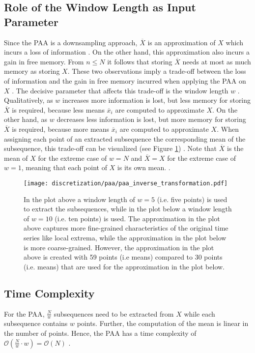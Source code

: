 \subsection*{Role of the Window Length as Input Parameter} \label{parameter_window_length}
Since the \ac{PAA} is a downsampling approach, $\overline{X}$ is an approximation of $X$ which incurs a loss of information \cite{PAA_Yi_Faloutsos}. On the other hand, this approximation also incurs a gain in free memory. From $n \leq N$ it follows that storing $\overline{X}$ needs at most as much memory as storing $X$. These two observations imply a trade-off between the loss of information and the gain in free memory incurred when applying the \ac{PAA} on $X$ \cite{SAX_Lin}. \newline
The decisive parameter that affects this trade-off is the window length $w$ \cite{SAX_Lin}. Qualitatively, as $w$ increases more information is lost, but less memory for storing $\overline{X}$ is required, because less means $\overline{x}_i$ are computed to approximate $X$. On the other hand, as $w$ decreases less information is lost, but more memory for storing $\overline{X}$ is required, because more means $\overline{x}_i$ are computed to approximate $X$. When assigning each point of an extracted subsequence the corresponding mean of the subsequence, this trade-off can be visualized (see Figure \ref{fig:PAA_inverse}) \cite{SAX_Lin}. \newline
Note that $\overline{X}$ is the mean of $X$ for the extreme case of $w = N$ and $\overline{X} = X$ for the extreme case of $w = 1$, meaning that each point of $X$ is its own mean. \cite{PAA_Keogh}.
\begin{figure}[htb]
\centering
\texttt{[image: discretization/paa/paa\_inverse\_transformation.pdf]}
\caption[Piecewise Aggregate Approximation - Effect of Window Size]{In the plot above a window length of $w = 5$ (i.e. five points) is used to extract the subsequences, while in the plot below a window length of $w = 10$ (i.e. ten points) is used. The approximation in the plot above captures more fine-grained characteristics of the original time series like local extrema, while the approximation in the plot below is more coarse-grained. However, the approximation in the plot above is created with 59 points (i.e means) compared to 30 points (i.e. means) that are used for the approximation in the plot below.} 
\label{fig:PAA_inverse}
\end{figure}
\subsection*{Time Complexity}
For the \ac{PAA}, $\frac{N}{w}$ subsequences need to be extracted from $X$ while each subsequence contains $w$ points. Further, the computation of the mean is linear in the number of points. Hence, the \ac{PAA} has a time complexity of $\mathcal{O}(\frac{N}{w}\cdot w) = \mathcal{O}(N)$ \cite{PAA_Keogh}.

